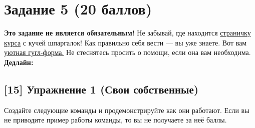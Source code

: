 \documentclass[12pt, a4paper, oneside]{article}
\begin{document}
	
	\section*{Задание 5  (20 баллов)  }
	
	\textbf{Это задание не является обязательным!}   Не забывай, где находится  \href{https://fulyankin.github.io/LaTeX/}{страничку курса} с кучей шпаргалок! Как правильно себя вести — вы уже знаете. Вот вам \href{https://docs.google.com/forms/d/e/1FAIpQLSe11kxKVfv07iCL1E9yNX7ll9swKImiVwRr1H70lslGzInRSg/viewform}{уютная гугл-форма.}   Не стеснятесь просить о помощи, если она вам необходима. \textbf{Дедлайн:  } 
	

\subsection*{[15]  Упражнение 1  (Свои собственные)}

Создайте следующие команды и продемонстрируйте как они работают. Если вы не приводите пример работы команды, то вы не получаете за неё баллы.
\end{document}
